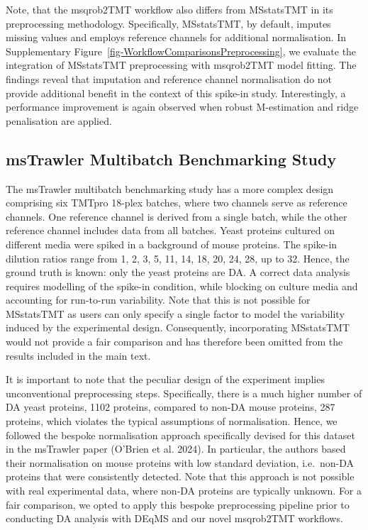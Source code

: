\documentclass[
  letterpaper,
  DIV=11,
  numbers=noendperiod]{scrartcl}
\begin{document}
Note, that the msqrob2TMT workflow also differs from MSstatsTMT in its
preprocessing methodology. Specifically, MSstatsTMT, by default, imputes
missing values and employs reference channels for additional
normalisation. In Supplementary
Figure~\ref{fig-WorkflowComparisonsPreprocessing}, we evaluate the
integration of MSstatsTMT preprocessing with msqrob2TMT model fitting.
The findings reveal that imputation and reference channel normalisation
do not provide additional benefit in the context of this spike-in study.
Interestingly, a performance improvement is again observed when robust
M-estimation and ridge penalisation are applied.

\subsection{msTrawler Multibatch Benchmarking Study}

The msTrawler multibatch benchmarking study has a more complex design
comprising six TMTpro 18-plex batches, where two channels serve as
reference channels. One reference channel is derived from a single
batch, while the other reference channel includes data from all batches.
Yeast proteins cultured on different media were spiked in a background
of mouse proteins. The spike-in dilution ratios range from 1, 2, 3, 5,
11, 14, 18, 20, 24, 28, up to 32. Hence, the ground truth is known: only
the yeast proteins are DA. A correct data analysis requires modelling of
the spike-in condition, while blocking on culture media and accounting
for run-to-run variability. Note that this is not possible for
MSstatsTMT as users can only specify a single factor to model the
variability induced by the experimental design. Consequently,
incorporating MSstatsTMT would not provide a fair comparison and has
therefore been omitted from the results included in the main text.

It is important to note that the peculiar design of the experiment
implies unconventional preprocessing steps. Specifically, there is a
much higher number of DA yeast proteins, 1102 proteins, compared to
non-DA mouse proteins, 287 proteins, which violates the typical
assumptions of normalisation. Hence, we followed the bespoke
normalisation approach specifically devised for this dataset in the
msTrawler paper (O'Brien et al. 2024). In particular, the authors based
their normalisation on mouse proteins with low standard deviation,
i.e.~non-DA proteins that were consistently detected. Note that this
approach is not possible with real experimental data, where non-DA
proteins are typically unknown. For a fair comparison, we opted to apply
this bespoke preprocessing pipeline prior to conducting DA analysis with
DEqMS and our novel msqrob2TMT workflows.
\end{document}
